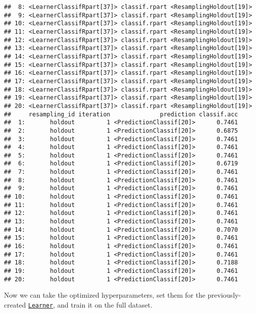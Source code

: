 \documentclass[
]{scrbook}
\begin{document}
\begin{verbatim}
##  8: <LearnerClassifRpart[37]> classif.rpart <ResamplingHoldout[19]>
##  9: <LearnerClassifRpart[37]> classif.rpart <ResamplingHoldout[19]>
## 10: <LearnerClassifRpart[37]> classif.rpart <ResamplingHoldout[19]>
## 11: <LearnerClassifRpart[37]> classif.rpart <ResamplingHoldout[19]>
## 12: <LearnerClassifRpart[37]> classif.rpart <ResamplingHoldout[19]>
## 13: <LearnerClassifRpart[37]> classif.rpart <ResamplingHoldout[19]>
## 14: <LearnerClassifRpart[37]> classif.rpart <ResamplingHoldout[19]>
## 15: <LearnerClassifRpart[37]> classif.rpart <ResamplingHoldout[19]>
## 16: <LearnerClassifRpart[37]> classif.rpart <ResamplingHoldout[19]>
## 17: <LearnerClassifRpart[37]> classif.rpart <ResamplingHoldout[19]>
## 18: <LearnerClassifRpart[37]> classif.rpart <ResamplingHoldout[19]>
## 19: <LearnerClassifRpart[37]> classif.rpart <ResamplingHoldout[19]>
## 20: <LearnerClassifRpart[37]> classif.rpart <ResamplingHoldout[19]>
##     resampling_id iteration              prediction classif.acc
##  1:       holdout         1 <PredictionClassif[20]>      0.7461
##  2:       holdout         1 <PredictionClassif[20]>      0.6875
##  3:       holdout         1 <PredictionClassif[20]>      0.7461
##  4:       holdout         1 <PredictionClassif[20]>      0.7461
##  5:       holdout         1 <PredictionClassif[20]>      0.7461
##  6:       holdout         1 <PredictionClassif[20]>      0.6719
##  7:       holdout         1 <PredictionClassif[20]>      0.7461
##  8:       holdout         1 <PredictionClassif[20]>      0.7461
##  9:       holdout         1 <PredictionClassif[20]>      0.7461
## 10:       holdout         1 <PredictionClassif[20]>      0.7461
## 11:       holdout         1 <PredictionClassif[20]>      0.7461
## 12:       holdout         1 <PredictionClassif[20]>      0.7461
## 13:       holdout         1 <PredictionClassif[20]>      0.7461
## 14:       holdout         1 <PredictionClassif[20]>      0.7070
## 15:       holdout         1 <PredictionClassif[20]>      0.7461
## 16:       holdout         1 <PredictionClassif[20]>      0.7461
## 17:       holdout         1 <PredictionClassif[20]>      0.7461
## 18:       holdout         1 <PredictionClassif[20]>      0.7188
## 19:       holdout         1 <PredictionClassif[20]>      0.7461
## 20:       holdout         1 <PredictionClassif[20]>      0.7461
\end{verbatim}

Now we can take the optimized hyperparameters, set them for the previously-created \href{https://mlr3.mlr-org.com/reference/Learner.html}{\texttt{Learner}}, and train it on the full dataset.
\end{document}
